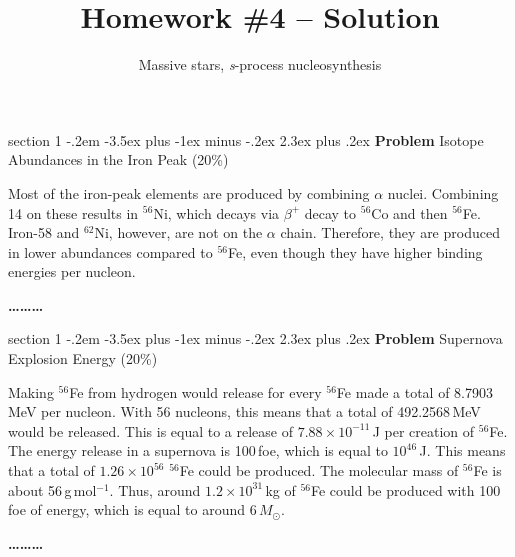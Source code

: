 \documentclass[letterpaper,12pt,twoside=false,DIV=11]{scrartcl}
\makeatletter
\newcommand{\topic}{\author}
\newenvironment{problem}{\@startsection
    {section}
    {1}
    {-.2em}
    {-3.5ex plus -1ex minus -.2ex}
    {2.3ex plus .2ex}
    {
        \pagebreak[3] %
        \noindent\sffamily\bfseries Problem
    }
}
{
    \begin{center}\large\bfseries\ldots\ldots\ldots\end{center}
}
\providecommand{\ex}[1]{\ensuremath{^{#1}}}
\makeatother
\begin{document}
\title{Homework \#4 -- Solution}
\topic{Massive stars, \emph{s}-process nucleosynthesis}
\date{}

\maketitle
\thispagestyle{fancy}

\begin{problem}{Isotope Abundances in the Iron Peak (20\%)} \label{prob1}

Most of the iron-peak elements are produced by combining $\alpha$ nuclei. Combining 14 on these results in \ex{56}Ni, which decays via $\beta^{+}$ decay to \ex{56}Co and then \ex{56}Fe. Iron-58 and \ex{62}Ni, however, are not on the $\alpha$ chain. Therefore, they are produced in lower abundances compared to \ex{56}Fe, even though they have higher binding energies per nucleon.

\end{problem}

\begin{problem}{Supernova Explosion Energy (20\%)}

Making \ex{56}Fe from hydrogen would release for every \ex{56}Fe made a total of 8.7903\,MeV per nucleon. With 56 nucleons, this means that a total of 492.2568\,MeV would be released. This is equal to a release of $7.88\times10^{-11}$\,J per creation of \ex{56}Fe. The energy release in a supernova is 100\,foe, which is equal to $10^{46}$\,J. This means that a total of $1.26\times10^{56}$ \ex{56}Fe could be produced. The molecular mass of \ex{56}Fe is about 56\,g\,mol$^{-1}$. Thus, around $1.2\times10^{31}$\,kg of \ex{56}Fe could be produced with 100\,foe of energy, which is equal to around $6\,M_\odot$.

\end{problem}
\end{document}

